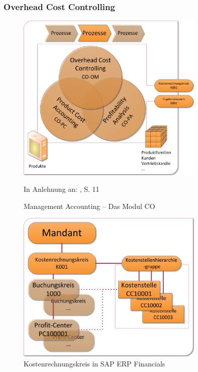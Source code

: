 \subsubsection{Overhead Cost Controlling}
\begin{figure}[htbp]
\begin{center}
\includegraphics[width=0.8\textwidth]{Images/managementAccounting.png}

   {\footnotesize In Anlehnung an: \cite{SAPCOOMABC2001}, S. 11}
   \caption[Management Accounting -- Das Modul CO]{Management Accounting -- Das Modul CO}\label{abb3}
\end{center}
\end{figure}\noindent
\begin{figure}[htbpr] 
\begin{center}
\includegraphics[width=0.8\textwidth]{Images/kostenRechnungskreis.png}
   \caption[Kostenrechnungskreis in SAP ERP Financials]{Kostenrechnungskreis in SAP ERP Financials}\label{abb4}
\end{center}
\end{figure}\noindent
